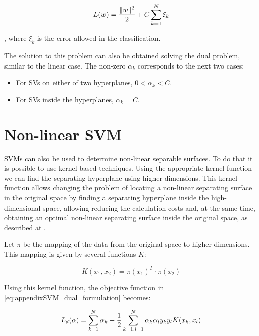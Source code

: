 \begin{equation}\label{eq:appendixSVM_soft_objective_function}
 L(w) = {{\|w\|^2} \over 2} + C \sum_{k=1}^N \xi_k
\end{equation}

, where $\xi_k$ is the error allowed in the classification.

The solution to this problem can also be obtained solving the dual problem, similar to the linear case. The non-zero $\alpha_k$ corresponds to the next two cases:
\begin{itemize}
 \item For SVs on either of two hyperplanes, $0 < \alpha_k < C$.
 \item For SVs inside the hyperplanes, $\alpha_k = C $.
\end{itemize}

\section{Non-linear \ac{SVM}}\label{ch:appendixSVM_03}

\acp{SVM} can also be used to determine non-linear separable surfaces. To do that it is possible to use kernel based techniques. Using the appropriate kernel function we can find the separating hyperplane using higher dimensions. This kernel function allows changing the problem of locating a non-linear separating surface in the original space by finding a separating hyperplane inside the high-dimensional space, allowing reducing the calculation costs and, at the same time, obtaining an optimal non-linear separating surface inside the original space, as described at \cite{burges1998tutorial}.

Let $\pi$ be the mapping of the data from the original space to higher dimensions. This mapping is given by several functions $K$:

\begin{equation}\label{eq:appendixSVM_kernel_func}
 K(x_1, x_2) = \pi(x_1)^T \cdot \pi(x_2)
\end{equation}

Using this kernel function, the objective function in \ref{eq:appendixSVM_dual_formulation} becomes:

\begin{equation}\label{eq:appendixSVM_soft_formulation}
 L_d(\alpha) = \sum_{k=1}^N  \alpha_k - {1 \over 2} \sum_{k = 1, l=1}^N \alpha_k \alpha_l y_k y_l K(x_k, x_l)
\end{equation}

